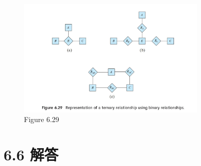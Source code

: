 \documentclass{article}
\begin{document}
	\begin{figure}[H]
		\centering
		\includegraphics[width=9cm]{./images/homework 6.jpg}
		\caption{Figure 6.29}
	\end{figure}
	
	\section*{6.6 解答}
	
\end{document}
